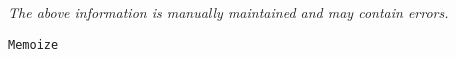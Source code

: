 \label{pkg:memoize}

{\tiny \it The above information is manually maintained and may contain errors.}
\begin{verbatim}
Memoize
\end{verbatim}
